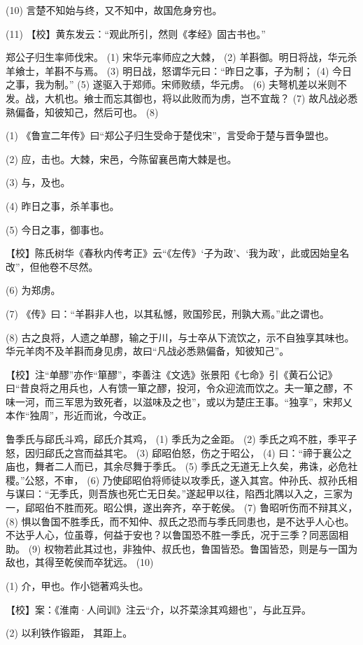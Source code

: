 \documentclass[12pt,UTF8]{ctexbook}
\begin{document}
(10) 言楚不知始与终，又不知中，故国危身穷也。

(11) 【校】黄东发云：“观此所引，然则《孝经》固古书也。”

郑公子归生率师伐宋。 (1) 宋华元率师应之大棘， (2) 羊斟御。明日将战，华元杀羊飨士，羊斟不与焉。 (3) 明日战，怒谓华元曰：“昨日之事，子为制； (4) 今日之事，我为制。” (5) 遂驱入于郑师。宋师败绩，华元虏。 (6) 夫弩机差以米则不发。战，大机也。飨士而忘其御也，将以此败而为虏，岂不宜哉？ (7) 故凡战必悉熟偏备，知彼知己，然后可也。 (8)

(1) 《鲁宣二年传》曰“郑公子归生受命于楚伐宋”，言受命于楚与晋争盟也。

(2) 应，击也。大棘，宋邑，今陈留襄邑南大棘是也。

(3) 与，及也。

(4) 昨日之事，杀羊事也。

(5) 今日之事，御事也。

【校】陈氏树华《春秋内传考正》云“《左传》‘子为政’、‘我为政’，此或因始皇名改”，但他卷不尽然。

(6) 为郑虏。

(7) 《传》曰：“羊斟非人也，以其私憾，败国殄民，刑孰大焉。”此之谓也。

(8) 古之良将，人遗之单醪，输之于川，与士卒从下流饮之，示不自独享其味也。华元羊肉不及羊斟而身见虏，故曰“凡战必悉熟偏备，知彼知己”。

【校】注“单醪”亦作“箪醪”，李善注《文选》张景阳《七命》引《黄石公记》曰“昔良将之用兵也，人有馈一箪之醪，投河，令众迎流而饮之。夫一箪之醪，不味一河，而三军思为致死者，以滋味及之也”，或以为楚庄王事。“独享”，宋邦乂本作“独周”，形近而讹，今改正。

鲁季氏与郈氏斗鸡，郈氏介其鸡， (1) 季氏为之金距。 (2) 季氏之鸡不胜，季平子怒，因归郈氏之宫而益其宅。 (3) 郈昭伯怒，伤之于昭公， (4) 曰：“禘于襄公之庙也，舞者二人而已，其余尽舞于季氏。 (5) 季氏之无道无上久矣，弗诛，必危社稷。”公怒，不审， (6) 乃使郈昭伯将师徒以攻季氏，遂入其宫。仲孙氏、叔孙氏相与谋曰：“无季氏，则吾族也死亡无日矣。”遂起甲以往，陷西北隅以入之，三家为一，郈昭伯不胜而死。昭公惧，遂出奔齐，卒于乾侯。 (7) 鲁昭听伤而不辩其义， (8) 惧以鲁国不胜季氏，而不知仲、叔氏之恐而与季氏同患也，是不达乎人心也。不达乎人心，位虽尊，何益于安也？以鲁国恐不胜一季氏，况于三季？同恶固相助。 (9) 权物若此其过也，非独仲、叔氏也，鲁国皆恐。鲁国皆恐，则是与一国为敌也，其得至乾侯而卒犹远。 (10)

(1) 介，甲也。作小铠著鸡头也。

【校】案：《淮南·人间训》注云“介，以芥菜涂其鸡翅也”，与此互异。

(2) 以利铁作锻距， 其距上。
\end{document}
